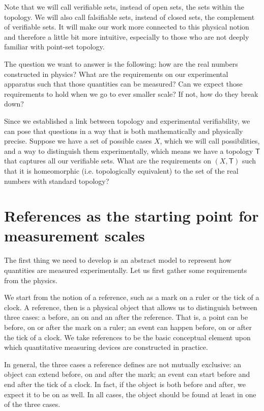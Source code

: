 \documentclass[12pt]{iopart}
\begin{document}
Note that we will call verifiable sets, instead of open sets, the sets within the topology. We will also call falsifiable sets, instead of closed sets, the complement of verifiable sets. It will make our work more connected to this physical notion and therefore a little bit more intuitive, especially to those who are not deeply familiar with point-set topology.

The question we want to answer is the following: how are the real numbers constructed in physics? What are the requirements on our experimental apparatus such that those quantities can be measured? Can we expect those requirements to hold when we go to ever smaller scale? If not, how do they break down?

Since we established a link between topology and experimental verifiability, we can pose that questions in a way that is both mathematically and physically precise. Suppose we have a set of possible cases $X$, which we will call possibilities, and a way to distinguish them experimentally, which means we have a topology $\mathsf{T}$ that captures all our verifiable sets. What are the requirements on $(X, \mathsf{T})$ such that it is homeomorphic (i.e. topologically equivalent) to the set of the real numbers with standard topology?

\section{References as the starting point for measurement scales}

The first thing we need to develop is an abstract model to represent how quantities are measured experimentally. Let us first gather some requirements from the physics.

We start from the notion of a reference, such as a mark on a ruler or the tick of a clock. A reference, then is a physical object that allows us to distinguish between three cases: a before, an on and an after the reference. That is, a point can be before, on or after the mark on a ruler; an event can happen before, on or after the tick of a clock. We take references to be the basic conceptual element upon which quantitative measuring devices are constructed in practice.

In general, the three cases a reference defines are not mutually exclusive: an object can extend before, on and after the mark; an event can start before and end after the tick of a clock. In fact, if the object is both before and after, we expect it to be on as well. In all cases, the object should be found at least in one of the three cases.
\end{document}
